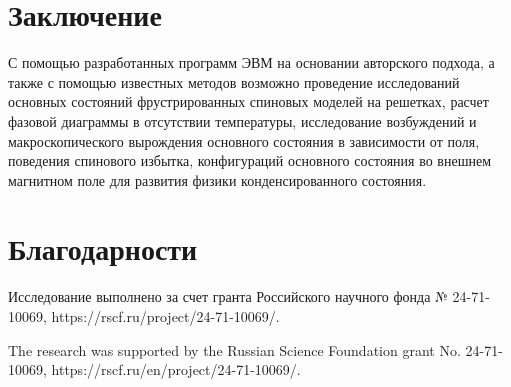 \documentclass[utf8, babel, sor, jor, amsmath, amssymb, reprint]{elsarticle} %
\begin{document}
\section{Заключение}

С помощью разработанных программ ЭВМ на основании авторского подхода, а также с помощью известных методов возможно проведение исследований основных состояний фрустрированных спиновых моделей на решетках, расчет фазовой диаграммы в отсутствии температуры, исследование возбуждений и макроскопического вырождения основного состояния в зависимости от поля, поведения спинового избытка, конфигураций основного состояния во внешнем магнитном поле для развития физики конденсированного состояния.


\section{Благодарности}

Исследование выполнено за счет гранта Российского научного фонда № 24-71-10069, https://rscf.ru/project/24-71-10069/.

The research was supported by the Russian Science Foundation grant No. 24-71-10069, https://rscf.ru/en/project/24-71-10069/.


\end{document}
